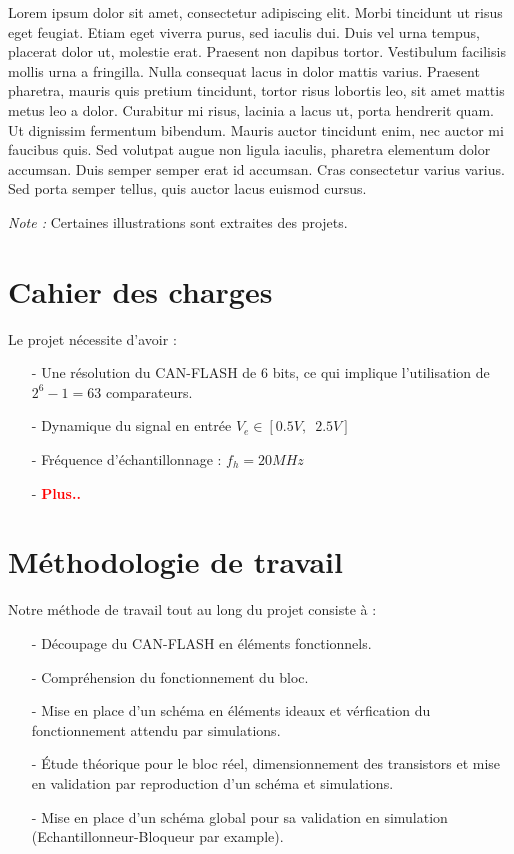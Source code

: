 \documentclass[11pt]{article}
\begin{document}
Lorem ipsum dolor sit amet, consectetur adipiscing elit. Morbi tincidunt ut risus eget feugiat.
Etiam eget viverra purus, sed iaculis dui. Duis vel urna tempus, placerat dolor ut, molestie erat.
Praesent non dapibus tortor. Vestibulum facilisis mollis urna a fringilla. Nulla consequat lacus in dolor mattis varius.
Praesent pharetra, mauris quis pretium tincidunt, tortor risus lobortis leo, sit amet mattis metus leo a dolor.
 Curabitur mi risus, lacinia a lacus ut, porta hendrerit quam. Ut dignissim fermentum bibendum.
 Mauris auctor tincidunt enim, nec auctor mi faucibus quis. Sed volutpat augue non ligula iaculis, pharetra elementum dolor accumsan.
 Duis semper semper erat id accumsan. Cras consectetur varius varius. Sed porta semper tellus, quis auctor lacus euismod cursus.

\textit{Note :} Certaines illustrations sont extraites des projets.

\section{Cahier des charges}
Le projet n\'ecessite d'avoir :
\begin{itemize}
\item[-] Une r\'esolution du CAN-FLASH de 6 bits, ce qui implique l'utilisation de $2^{6} -1 = 63 $ comparateurs.
\item[-] Dynamique du signal en entr\'ee $V_e \in [0.5 V,\phantom{2} 2.5V]$
\item[-] Fr\'equence d'\'echantillonnage : $f_h = 20 MHz $
\item[-] \textbf{\textcolor{red}{Plus..}}
\end{itemize}

\section{M\'ethodologie de travail}
Notre m\'ethode de travail tout au long du projet consiste \`a :
\begin{itemize}
  \item[-] D\'ecoupage du CAN-FLASH en \'el\'ements fonctionnels.
  \item[-] Compr\'ehension du fonctionnement du bloc.
  \item[-] Mise en place d'un sch\'ema en \'el\'ements ideaux et v\'erfication du fonctionnement attendu par simulations.
  \item[-] \'Etude th\'eorique pour le bloc r\'eel, dimensionnement des transistors et mise en validation par reproduction
  d'un sch\'ema et simulations.
  \item[-] Mise en place d'un sch\'ema global pour sa validation en simulation (Echantillonneur-Bloqueur par example).
\end{itemize}
\end{document}
